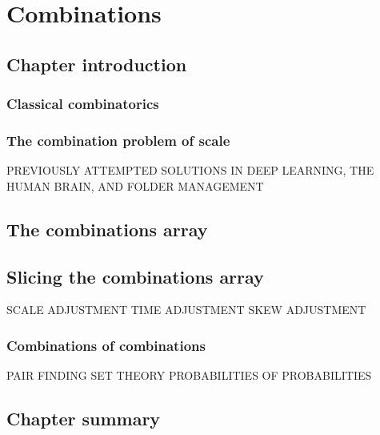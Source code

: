 \chapter{Combinations}
\section{Chapter introduction}
\subsection{Classical combinatorics}
\subsection{The combination problem of scale}
PREVIOUSLY ATTEMPTED SOLUTIONS IN DEEP LEARNING, THE HUMAN BRAIN, AND FOLDER MANAGEMENT
\section{The combinations array}
\section{Slicing the combinations array}
SCALE ADJUSTMENT
TIME ADJUSTMENT
SKEW ADJUSTMENT
\subsection{Combinations of combinations}
PAIR FINDING
SET THEORY
PROBABILITIES OF PROBABILITIES
\section{Chapter summary}
